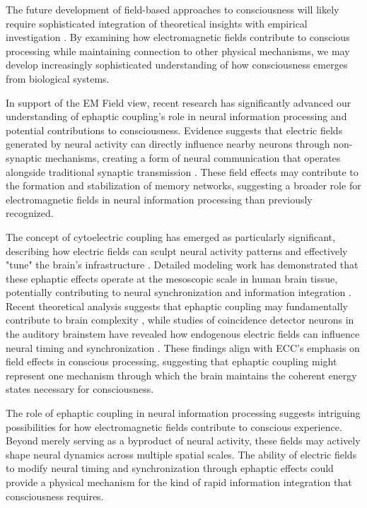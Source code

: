 The future development of field-based approaches to consciousness will likely require sophisticated integration of theoretical insights with empirical investigation \cite{Singer2001}. By examining how electromagnetic fields contribute to conscious processing while maintaining connection to other physical mechanisms, we may develop increasingly sophisticated understanding of how consciousness emerges from biological systems.

In support of the EM Field view, recent research has significantly advanced our understanding of ephaptic coupling's role in neural information processing and potential contributions to consciousness. Evidence suggests that electric fields generated by neural activity can directly influence nearby neurons through non-synaptic mechanisms, creating a form of neural communication that operates alongside traditional synaptic transmission \cite{Pinotsis2023Ephaptic}. These field effects may contribute to the formation and stabilization of memory networks, suggesting a broader role for electromagnetic fields in neural information processing than previously recognized.

The concept of cytoelectric coupling has emerged as particularly significant, describing how electric fields can sculpt neural activity patterns and effectively "tune" the brain's infrastructure \cite{Pinotsis2023Cytoelectric}. Detailed modeling work has demonstrated that these ephaptic effects operate at the mesoscopic scale in human brain tissue, potentially contributing to neural synchronization and information integration \cite{Reimann2020Modeling}. Recent theoretical analysis suggests that ephaptic coupling may fundamentally contribute to brain complexity \cite{Cunha2024Ephapticity}, while studies of coincidence detector neurons in the auditory brainstem have revealed how endogenous electric fields can influence neural timing and synchronization \cite{Goldwyn2016Neuronal}. These findings align with ECC's emphasis on field effects in conscious processing, suggesting that ephaptic coupling might represent one mechanism through which the brain maintains the coherent energy states necessary for consciousness.

The role of ephaptic coupling in neural information processing suggests intriguing possibilities for how electromagnetic fields contribute to conscious experience. Beyond merely serving as a byproduct of neural activity, these fields may actively shape neural dynamics across multiple spatial scales. The ability of electric fields to modify neural timing and synchronization through ephaptic effects \cite{Goldwyn2016Neuronal} could provide a physical mechanism for the kind of rapid information integration that consciousness requires.

